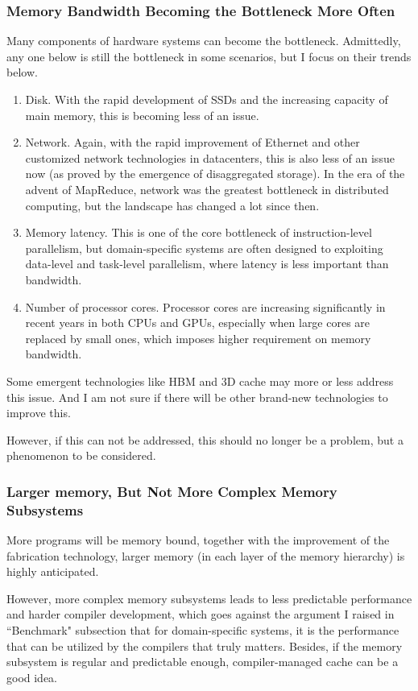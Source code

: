 \documentclass[11pt]{article}
\begin{document}
\subsubsection*{Memory Bandwidth Becoming the Bottleneck More Often}
Many components of hardware systems can become the bottleneck.
Admittedly, any one below is still the bottleneck in some scenarios, but I focus on their trends below.
\begin{enumerate}
    \item Disk.
    With the rapid development of SSDs and the increasing capacity of main memory, this is becoming less of an issue.
    \item Network.
    Again, with the rapid improvement of Ethernet and other customized network technologies in datacenters, this is also less of an issue now (as proved by the emergence of disaggregated storage). In the era of the advent of MapReduce, network was the greatest bottleneck in distributed computing, but the landscape has changed a lot since then.
    \item Memory latency.
    This is one of the core bottleneck of instruction-level parallelism, but domain-specific systems are often designed to exploiting data-level and task-level parallelism, where latency is less important than bandwidth.
    \item Number of processor cores.
    Processor cores are increasing significantly in recent years in both CPUs and GPUs, especially when large cores are replaced by small ones, which imposes higher requirement on memory bandwidth.
\end{enumerate}
Some emergent technologies like HBM and 3D cache may more or less address this issue.
And I am not sure if there will be other brand-new technologies to improve this.

However, if this can not be addressed, this should no longer be a problem, but a phenomenon to be considered.

\subsubsection*{Larger memory, But Not More Complex Memory Subsystems}
More programs will be memory bound, together with the improvement of the fabrication technology, larger memory (in each layer of the memory hierarchy) is highly anticipated.

However, more complex memory subsystems leads to less predictable performance and harder compiler development, which goes against the argument I raised in ``Benchmark" subsection that for domain-specific systems, it is the performance that can be utilized by the compilers that truly matters.
Besides, if the memory subsystem is regular and predictable enough, compiler-managed cache can be a good idea.
\end{document}
